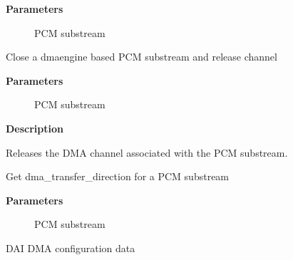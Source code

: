 \documentclass[a4paper,8pt,english]{sphinxmanual}
\begin{document}
\textbf{Parameters}
\begin{description}
\item[{}] \leavevmode
PCM substream

\end{description}

\begin{fulllineitems}
\label{sound/kernel-api/alsa-driver-api:c.snd_dmaengine_pcm_close_release_chan}
Close a dmaengine based PCM substream and release channel

\end{fulllineitems}


\textbf{Parameters}
\begin{description}
\item[{}] \leavevmode
PCM substream

\end{description}

\textbf{Description}

Releases the DMA channel associated with the PCM substream.

\begin{fulllineitems}
\label{sound/kernel-api/alsa-driver-api:c.snd_pcm_substream_to_dma_direction}
Get dma\_transfer\_direction for a PCM substream

\end{fulllineitems}


\textbf{Parameters}
\begin{description}
\item[{}] \leavevmode
PCM substream

\end{description}

\begin{fulllineitems}
\label{sound/kernel-api/alsa-driver-api:c.snd_dmaengine_dai_dma_data}
DAI DMA configuration data

\end{fulllineitems}
\end{document}
